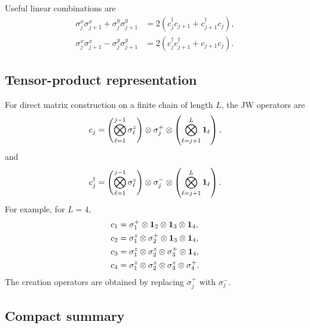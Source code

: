 Useful linear combinations are
\begin{align}
    \sigma_j^x\sigma_{j+1}^x
    +
    \sigma_j^y\sigma_{j+1}^y
    &=
    2\left(
        c_j^\dagger c_{j+1}
        +
        c_{j+1}^\dagger c_j
    \right),
    \\
    \sigma_j^x\sigma_{j+1}^x
    -
    \sigma_j^y\sigma_{j+1}^y
    &=
    2\left(
        c_j^\dagger c_{j+1}^\dagger
        +
        c_{j+1}c_j
    \right).
\end{align}

\subsection*{Tensor-product representation}

For direct matrix construction on a finite chain of length \(L\), the JW operators are
\begin{equation}
    c_j
    =
    \left(
        \bigotimes_{\ell=1}^{j-1}\sigma_\ell^z
    \right)
    \otimes
    \sigma_j^+
    \otimes
    \left(
        \bigotimes_{\ell=j+1}^{L}\mathbf{1}_\ell
    \right),
\end{equation}
and
\begin{equation}
    c_j^\dagger
    =
    \left(
        \bigotimes_{\ell=1}^{j-1}\sigma_\ell^z
    \right)
    \otimes
    \sigma_j^-
    \otimes
    \left(
        \bigotimes_{\ell=j+1}^{L}\mathbf{1}_\ell
    \right).
\end{equation}
For example, for \(L=4\),
\begin{align}
    c_1
    &=
    \sigma_1^+\otimes\mathbf{1}_2\otimes\mathbf{1}_3\otimes\mathbf{1}_4,
    \\
    c_2
    &=
    \sigma_1^z\otimes\sigma_2^+\otimes\mathbf{1}_3\otimes\mathbf{1}_4,
    \\
    c_3
    &=
    \sigma_1^z\otimes\sigma_2^z\otimes\sigma_3^+\otimes\mathbf{1}_4,
    \\
    c_4
    &=
    \sigma_1^z\otimes\sigma_2^z\otimes\sigma_3^z\otimes\sigma_4^+.
\end{align}
The creation operators are obtained by replacing \(\sigma_j^+\) with \(\sigma_j^-\).

\subsection*{Compact summary}

